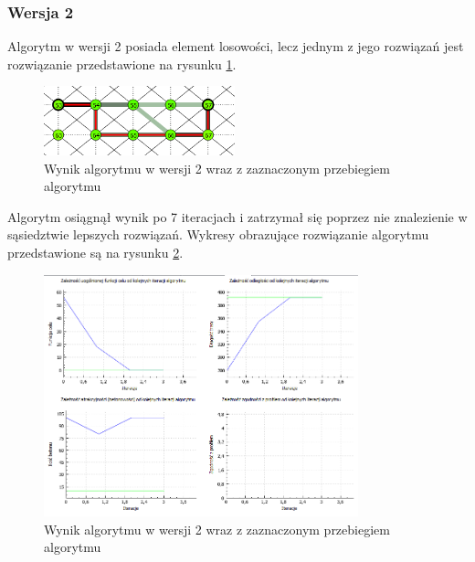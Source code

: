 \documentclass[12pt,a4paper]{article}
\begin{document}
\subsubsection{Wersja 2}
Algorytm w wersji 2 posiada element losowości, lecz jednym z jego rozwiązań jest rozwiązanie przedstawione na rysunku \ref{test1_2}.
\begin{figure}[!h]
	\centering
	\includegraphics[height=20mm]{./ilustracje/test12.png}
	\caption{Wynik algorytmu w wersji 2 wraz z zaznaczonym przebiegiem algorytmu}
	\label{test1_2}
\end{figure}
Algorytm osiągnął wynik po 7 iteracjach i zatrzymał się poprzez nie znalezienie w sąsiedztwie lepszych rozwiązań. Wykresy obrazujące rozwiązanie algorytmu przedstawione są na rysunku \ref{test1_graf2}.
\begin{figure}[!h]
	\centering
	\includegraphics[height=70mm]{./ilustracje/test12graf.png}
	\caption{Wynik algorytmu w wersji 2 wraz z zaznaczonym przebiegiem algorytmu}
	\label{test1_graf2}
\end{figure}
\end{document}
